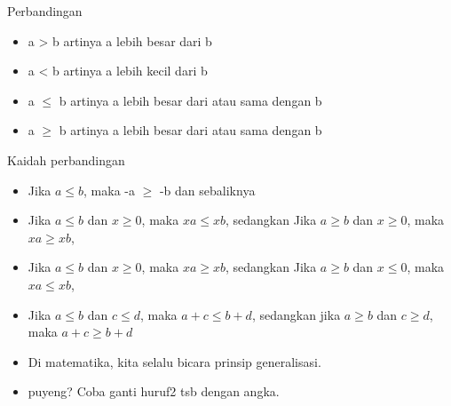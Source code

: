 \documentclass[
  ignorenonframetext,
]{beamer}
\providecommand{\tightlist}{%
  \setlength{\itemsep}{0pt}\setlength{\parskip}{0pt}}\usepackage{longtable,booktabs,array}
\begin{document}
\begin{frame}{Perbandingan}
\label{perbandingan}
\begin{itemize}
\tightlist
\item
  a \textgreater{} b artinya a lebih besar dari b
\item
  a \textless{} b artinya a lebih kecil dari b
\item
  a \(\leq\) b artinya a lebih besar dari atau sama dengan b
\item
  a \(\geq\) b artinya a lebih besar dari atau sama dengan b
\end{itemize}
\end{frame}

\begin{frame}{Kaidah perbandingan}
\label{kaidah-perbandingan}
\begin{itemize}
\item
  Jika \(a \leq b\), maka -a \(\geq\) -b dan sebaliknya
\item
  Jika \(a \leq b\) dan \(x \geq 0\), maka \(xa \leq xb\), sedangkan
  Jika \(a \geq b\) dan \(x \geq 0\), maka \(xa \geq xb\),
\item
  Jika \(a \leq b\) dan \(x \geq 0\), maka \(xa \geq xb\), sedangkan
  Jika \(a \geq b\) dan \(x \leq 0\), maka \(xa \leq xb\),
\item
  Jika \(a \leq b\) dan \(c \leq d\), maka \(a+c \leq b+d\), sedangkan
  jika \(a \geq b\) dan \(c \geq d\), maka \(a+c \geq b+d\)
\item
  Di matematika, kita selalu bicara prinsip generalisasi.
\item
  puyeng? Coba ganti huruf2 tsb dengan angka.
\end{itemize}
\end{frame}
\end{document}
